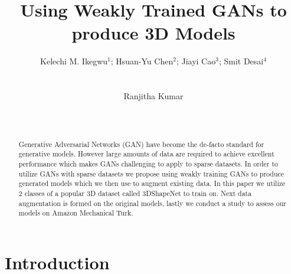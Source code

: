 \documentclass{sigchi}
\begin{document}
\title{Using Weakly Trained GANs to produce 3D Models}

\author{
  \alignauthor Kelechi M. Ikegwu\(^1\); Hsuan-Yu Chen\(^2\); Jiayi Cao\(^3\); Smit Desai\(^4\)\\
    \\
    \\
  \alignauthor Ranjitha Kumar\\
    \\
    \\
}

\maketitle

\begin{abstract}
Generative Adversarial Networks (GAN) have become the de-facto standard for generative models. However large amounts of data are required to achieve excellent performance which makes GANs challenging to apply to sparse datasets. In order to utilize GANs with sparse datasets we propose using weakly training GANs to produce generated models which we then use to augment existing data. In this paper we utilize 2 classes of a popular 3D dataset called 3DShapeNet to train on. Next data augmentation is formed on the original models, lastly we conduct a study to assess our models on Amazon Mechanical Turk.
\end{abstract}



\section{Introduction}
\end{document}
